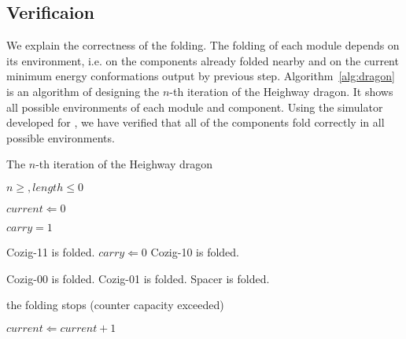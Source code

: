 \subsection{Verificaion}

We explain the correctness of the folding.
The folding of each module depends on its environment, i.e. on the components already folded nearby and on the current minimum energy conformations output by previous step.
Algorithm~\ref{alg:dragon} is an algorithm of designing the $n$-th iteration of the Heighway dragon.
It shows all possible environments of each module and component.
Using the simulator developed for \cite{HaKiOtSe2016}, we have verified that all of the components fold correctly in all possible environments.


\begin{algorithm}                      
\caption{The $n$-th iteration of the Heighway dragon}         
\label{alg:dragon}                          
\begin{algorithmic}                  
\REQUIRE $n \geq , length \leq 0$

\STATE $current \Leftarrow 0$

\STATE $carry = 1$

\STATE Cozig-11 is folded.
\STATE $carry \Leftarrow 0$ 
\STATE Cozig-10 is folded.
\ENDIF


\STATE Cozig-00 is folded.
\STATE Cozig-01 is folded.
\ENDIF
\ENDIF
\STATE Spacer is folded.
\ENDFOR

\STATE the folding stops (counter capacity exceeded)
\ENDIF
 
\STATE $current \Leftarrow current + 1$
\ENDWHILE

\end{algorithmic}
\end{algorithm}

